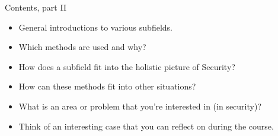 \begin{frame}
  \begin{block}{Contents, part II}
    \begin{itemize}
      \item General introductions to various subfields.
      \item Which methods are used and why?
      \item How does a subfield fit into the holistic picture of Security?
      \item How can these methods fit into other situations?
    \end{itemize}
  \end{block}

  \begin{exercise}
    \begin{itemize}
      \item What is an area or problem that you're interested in (in security)?
      \item Think of an interesting case that you can reflect on during the 
        course.
    \end{itemize}
  \end{exercise}
\end{frame}

